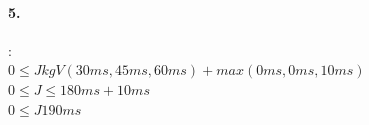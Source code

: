\documentclass[12pt,a4paper,oneside,ngerman]{article}
\begin{document}
\paragraph{5.}:\\

\( 0 \leq J kgV(30ms, 45ms, 60ms) + max(0ms, 0ms, 10ms) \) \\
\( 0 \leq J \leq 180ms + 10ms\)\\
\( 0 \leq J 190ms\)\\
\end{document}
